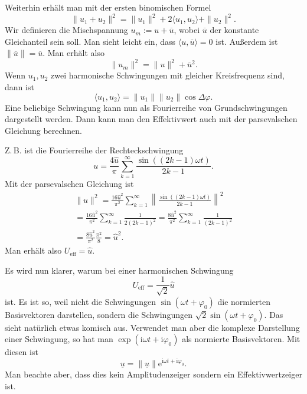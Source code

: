 \documentclass[a4paper,10pt,fleqn,twocolumn,twoside]{article}
\numberwithin{equation}{section}
\newcommand{\ui}{\mathrm i}
\newcommand{\ee}{\mathrm e}
\begin{document}
Weiterhin erhält man mit der ersten binomischen Formel
\begin{equation}
\|u_1+u_2\|^2 = \|u_1\|^2+2\langle u_1,u_2\rangle+\|u_2\|^2.
\end{equation}
Wir definieren die Mischspannung $u_m := u+\overline u$,
wobei $\overline u$ der konstante Gleichanteil sein soll. Man sieht
leicht ein, dass $\langle u,\overline u\rangle=0$ ist.
Außerdem ist $\|\overline u\|=\overline u$. Man erhält also
\begin{equation}
\|u_m\|^2 = \|u\|^2+\overline u^2.
\end{equation}
Wenn $u_1,u_2$ zwei harmonische Schwingungen mit gleicher
Kreisfrequenz sind, dann ist
\begin{equation}
\langle u_1,u_2\rangle = \|u_1\|\|u_2\|\cos\Delta\varphi.
\end{equation}
Eine beliebige Schwingung kann nun als Fourierreihe von
Grundschwingungen dargestellt werden. Dann kann man den Effektivwert
auch mit der parsevalschen Gleichung berechnen.

Z.\,B. ist die Fourierreihe der Rechteckschwingung
\begin{equation}
u = \frac{4\hat u}{\pi} \sum_{k=1}^{\infty}
\frac{\sin((2k-1)\omega t)}{2k-1}.
\end{equation}
Mit der parsevalschen Gleichung ist
\begin{gather*}
\|u\|^2 = \frac{16\hat u^2}{\pi^2} \sum_{k=1}^{\infty}
\left\|\frac{\sin((2k-1)\omega t)}{2k-1}\right\|^2\\
= \frac{16\hat u^2}{\pi^2} \sum_{k=1}^{\infty} \frac{1}{2(2k-1)^2}
= \frac{8\hat u^2}{\pi^2} \sum_{k=1}^{\infty} \frac{1}{(2k-1)^2}\\
= \frac{8\hat u^2}{\pi^2} \frac{\pi^2}{8} = \hat u^2.
\end{gather*}
Man erhält also $U_\mathrm{eff}=\hat u$.

Es wird nun klarer, warum bei einer harmonischen Schwingung
\begin{equation}
U_\mathrm{eff}=\frac{1}{\sqrt{2}}\hat u
\end{equation}
ist. Es ist so, weil nicht die Schwingungen
$\sin(\omega t+\varphi_0)$ die normierten Basisvektoren darstellen,
sondern die Schwingungen $\sqrt{2}\sin(\omega t+\varphi_0)$. Das
sieht natürlich etwas komisch aus. Verwendet man aber die komplexe
Darstellung einer Schwingung, so hat man
$\exp(\ui\omega t+\ui\varphi_0)$ als normierte Basisvektoren.
Mit diesen ist
\begin{equation}
\underline u = \|\underline u\|\ee^{\ui\omega t+\ui\varphi_0}.
\end{equation}
Man beachte aber, dass dies kein Amplitudenzeiger sondern ein
Effektivwertzeiger ist.
\end{document}
